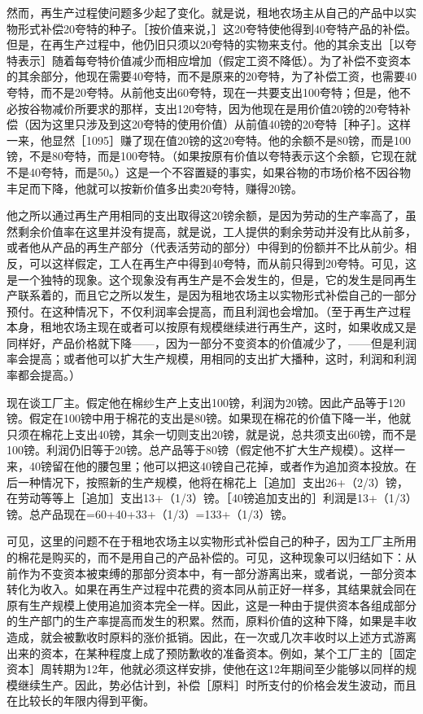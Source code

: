 然而，再生产过程使问题多少起了变化。就是说，租地农场主从自己的产品中以实物形式补偿20夸特的种子。［按价值来说，］这20夸特使他得到40夸特产品的补偿。但是，在再生产过程中，他仍旧只须以20夸特的实物来支付。他的其余支出［以夸特表示］随着每夸特价值减少而相应增加（假定工资不降低）。为了补偿不变资本的其余部分，他现在需要40夸特，而不是原来的20夸特，为了补偿工资，也需要40夸特，而不是20夸特。从前他支出60夸特，现在一共要支出100夸特；但是，他不必按谷物减价所要求的那样，支出120夸特，因为他现在是用价值20镑的20夸特补偿（因为这里只涉及到这20夸特的使用价值）从前值40镑的20夸特［种子］。这样一来，他显然［1095］赚了现在值20镑的这20夸特。他的余额不是80镑，而是100镑，不是80夸特，而是100夸特。（如果按原有价值以夸特表示这个余额，它现在就不是40夸特，而是50。）这是一个不容置疑的事实，如果谷物的市场价格不因谷物丰足而下降，他就可以按新价值多出卖20夸特，赚得20镑。

他之所以通过再生产用相同的支出取得这20镑余额，是因为劳动的生产率高了，虽然剩余价值率在这里并没有提高，就是说，工人提供的剩余劳动并没有比从前多，或者他从产品的再生产部分（代表活劳动的部分）中得到的份额并不比从前少。相反，可以这样假定，工人在再生产中得到40夸特，而从前只得到20夸特。可见，这是一个独特的现象。这个现象没有再生产是不会发生的，但是，它的发生是同再生产联系着的，而且它之所以发生，是因为租地农场主以实物形式补偿自己的一部分预付。在这种情况下，不仅利润率会提高，而且利润也会增加。（至于再生产过程本身，租地农场主现在或者可以按原有规模继续进行再生产，这时，如果收成又是同样好，产品价格就下降——，因为一部分不变资本的价值减少了，——但是利润率会提高；或者他可以扩大生产规模，用相同的支出扩大播种，这时，利润和利润率都会提高。）

现在谈工厂主。假定他在棉纱生产上支出100镑，利润为20镑。因此产品等于120镑。假定在100镑中用于棉花的支出是80镑。如果现在棉花的价值下降一半，他就只须在棉花上支出40镑，其余一切则支出20镑，就是说，总共须支出60镑，而不是100镑。利润仍旧等于20镑。总产品等于80镑（假定他不扩大生产规模）。这样一来，40镑留在他的腰包里；他可以把这40镑自己花掉，或者作为追加资本投放。在后一种情况下，按照新的生产规模，他将在棉花上［追加］支出26+（2/3）镑，在劳动等等上［追加］支出13+（1/3）镑。［40镑追加支出的］利润是13+（1/3）镑。总产品现在=60+40+33+（1/3）=133+（1/3）镑。

可见，这里的问题不在于租地农场主以实物形式补偿自己的种子，因为工厂主所用的棉花是购买的，而不是用自己的产品补偿的。可见，这种现象可以归结如下：从前作为不变资本被束缚的那部分资本中，有一部分游离出来，或者说，一部分资本转化为收入。如果在再生产过程中花费的资本同从前正好一样多，其结果就会同在原有生产规模上使用追加资本完全一样。因此，这是一种由于提供资本各组成部分的生产部门的生产率提高而发生的积累。然而，原料价值的这种下降，如果是丰收造成，就会被歉收时原料的涨价抵销。因此，在一次或几次丰收时以上述方式游离出来的资本，在某种程度上成了预防歉收的准备资本。例如，某个工厂主的［固定资本］周转期为12年，他就必须这样安排，使他在这12年期间至少能够以同样的规模继续生产。因此，势必估计到，补偿［原料］时所支付的价格会发生波动，而且在比较长的年限内得到平衡。

